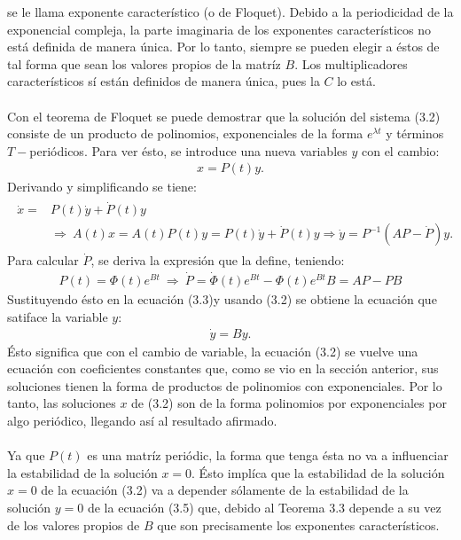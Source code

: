 se le llama exponente característico (o de Floquet). Debido a la periodicidad de la exponencial compleja, la parte imaginaria de los exponentes característicos no está definida de manera única. Por lo tanto, siempre se pueden elegir a éstos de tal forma que sean los valores propios de la matríz $B$. Los multiplicadores característicos sí están definidos de manera única, pues la $C$ lo está.
\\
\\
Con el teorema de Floquet se puede demostrar que la solución del sistema (3.2) consiste de un producto de polinomios, exponenciales de la forma $e^{\lambda t}$ y términos $T-$periódicos. Para ver ésto, se introduce una nueva variables $y$ con el cambio:
\begin{eqnarray}
x=P(t)y.
\end{eqnarray}
Derivando y simplificando se tiene:
\begin{eqnarray}
\begin{split}
\dot{x}=&P(t)\dot{y}+\dot{P}(t)y \\ 
& \Rightarrow \ A(t)x=A(t)P(t)y=P(t)\dot{y}+\dot{P}(t)y \Rightarrow \dot{y} = P^{-1}(AP-\dot{P})y.
\end{split}
\end{eqnarray}
Para calcular $\dot{P}$, se deriva la expresión que la define, teniendo:
\begin{eqnarray*}
P(t)=\Phi(t)e^{Bt} \ \Rightarrow \ \dot{P}= \dot{\Phi}(t)e^{Bt} - \Phi(t)e^{Bt}B = AP - PB
\end{eqnarray*}
Sustituyendo ésto en la ecuación (3.3)y usando (3.2) se obtiene la ecuación que satiface la variable $y$:
\begin{eqnarray}
\dot{y}=By.
\end{eqnarray}
Ésto significa que con el cambio de variable, la ecuación (3.2) se vuelve una ecuación con coeficientes constantes que, como se vio en la sección anterior, sus soluciones tienen la forma de productos de polinomios con exponenciales. Por lo tanto, las soluciones $x$ de (3.2) son de la forma polinomios por exponenciales por algo periódico, llegando así al resultado afirmado.
\\
\\
Ya que $P(t)$ es una matríz periódic, la forma que tenga ésta no va a influenciar la estabilidad de la solución $x=0$. Ésto implíca que la estabilidad de la solución $x=0$ de la ecuación (3.2) va a depender sólamente de la estabilidad de la solución $y=0$ de la ecuación (3.5) que, debido al Teorema 3.3 depende a su vez de los valores propios de $B$ que son precisamente los exponentes característicos.
